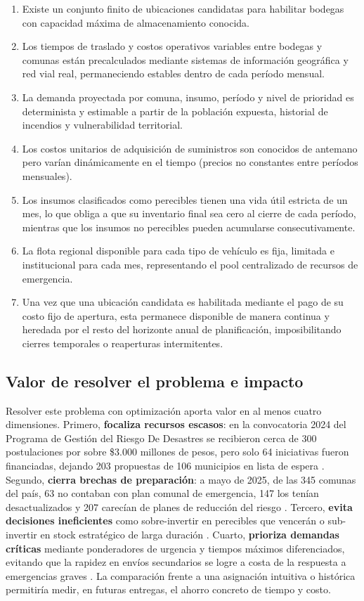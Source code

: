 \documentclass[letterpaper]{article}
\begin{document}
\begin{flushleft}
\begin{enumerate}[leftmargin=2em, itemsep=2pt]
  \item Existe un conjunto finito de ubicaciones candidatas para habilitar bodegas con capacidad máxima de almacenamiento conocida.
  \item Los tiempos de traslado y costos operativos variables entre bodegas y comunas están precalculados mediante sistemas de información geográfica y red vial real, permaneciendo estables dentro de cada período mensual.
  \item La demanda proyectada por comuna, insumo, período y nivel de prioridad es determinista y estimable a partir de la población expuesta, historial de incendios y vulnerabilidad territorial.
  \item Los costos unitarios de adquisición de suministros son conocidos de antemano pero varían dinámicamente en el tiempo (precios no constantes entre períodos mensuales).
  \item Los insumos clasificados como perecibles tienen una vida útil estricta de un mes, lo que obliga a que su inventario final sea cero al cierre de cada período, mientras que los insumos no perecibles pueden acumularse consecutivamente.
  \item La flota regional disponible para cada tipo de vehículo es fija, limitada e institucional para cada mes, representando el pool centralizado de recursos de emergencia.
  \item Una vez que una ubicación candidata es habilitada mediante el pago de su costo fijo de apertura, esta permanece disponible de manera continua y heredada por el resto del horizonte anual de planificación, imposibilitando cierres temporales o reaperturas intermitentes.
\end{enumerate}

\subsection{Valor de resolver el problema e impacto}

Resolver este problema con optimización aporta valor en al menos cuatro dimensiones. Primero, \textbf{focaliza recursos escasos}: en la convocatoria 2024 del Programa de Gestión del Riesgo De Desastres se recibieron cerca de 300 postulaciones por sobre \$3.000 millones de pesos, pero solo 64 iniciativas fueron financiadas, dejando 203 propuestas de 106 municipios en lista de espera \cite{dipres2026}. Segundo, \textbf{cierra brechas de preparación}: a mayo de 2025, de las 345 comunas del país, 63 no contaban con plan comunal de emergencia, 147 los tenían desactualizados y 207 carecían de planes de reducción del riesgo \cite{dipres2026}. Tercero, \textbf{evita decisiones ineficientes} como sobre-invertir en perecibles que vencerán o sub-invertir en stock estratégico de larga duración \cite{esfera2018}. Cuarto, \textbf{prioriza demandas críticas} mediante ponderadores de urgencia y tiempos máximos diferenciados, evitando que la rapidez en envíos secundarios se logre a costa de la respuesta a emergencias graves \cite{esfera2018}. La comparación frente a una asignación intuitiva o histórica permitiría medir, en futuras entregas, el ahorro concreto de tiempo y costo.


\end{flushleft}
\end{document}
